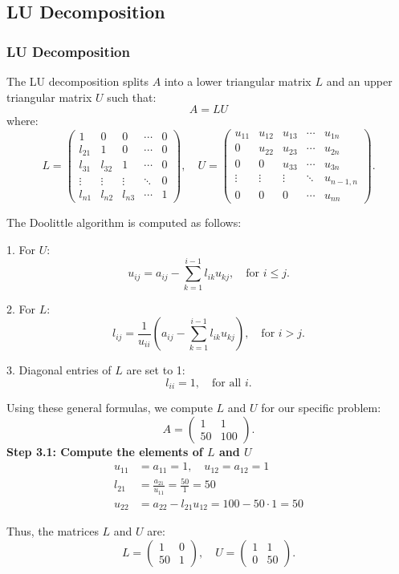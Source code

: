 \documentclass{beamer}
\theoremstyle{remark}
\numberwithin{equation}{section}
\begin{document}
	\subsection{LU Decomposition}
	\begin{frame}[allowframebreaks]
		\frametitle{LU Decomposition}
		The LU decomposition splits \(A\) into a lower triangular matrix \(L\) and an upper triangular matrix \(U\) such that:
		\[
		A = LU
		\]
		where:
		\[
		L = \begin{pmatrix} 1 & 0 & 0 & \cdots & 0 \\ l_{21} & 1 & 0 & \cdots & 0 \\ l_{31} & l_{32} & 1 & \cdots & 0 \\ \vdots & \vdots & \vdots & \ddots & 0 \\ l_{n1} & l_{n2} & l_{n3} & \cdots & 1 \end{pmatrix}, \quad
		U = \begin{pmatrix} u_{11} & u_{12} & u_{13} & \cdots & u_{1n} \\ 0 & u_{22} & u_{23} & \cdots & u_{2n} \\ 0 & 0 & u_{33} & \cdots & u_{3n} \\ \vdots & \vdots & \vdots & \ddots & u_{n-1,n} \\ 0 & 0 & 0 & \cdots & u_{nn} \end{pmatrix}.
		\]
		
		The Doolittle algorithm is computed as follows:
		
		1. For \(U\):
		\[
		u_{ij} = a_{ij} - \sum_{k=1}^{i-1} l_{ik} u_{kj}, \quad \text{for } i \leq j.
		\]
		
		2. For \(L\):
		\[
		l_{ij} = \frac{1}{u_{ii}} \left(a_{ij} - \sum_{k=1}^{i-1} l_{ik} u_{kj} \right), \quad \text{for } i > j.
		\]
		
		3. Diagonal entries of \(L\) are set to 1:
		\[
		l_{ii} = 1, \quad \text{for all } i.
		\]
		
		Using these general formulas, we compute \(L\) and \(U\) for our specific problem:
		\[
		A = \begin{pmatrix} 1 & 1 \\ 50 & 100 \end{pmatrix}.
		\]
		\textbf{Step 3.1: Compute the elements of \(L\) and \(U\)}\\
		\begin{align}
			u_{11} &= a_{11} = 1, \quad u_{12} = a_{12} = 1 \\
			l_{21} &= \frac{a_{21}}{u_{11}} = \frac{50}{1} = 50 \\
			u_{22} &= a_{22} - l_{21}u_{12} = 100 - 50 \cdot 1 = 50
		\end{align}
		
		Thus, the matrices \(L\) and \(U\) are:
		\[
		L = \begin{pmatrix} 1 & 0 \\ 50 & 1 \end{pmatrix}, \quad U = \begin{pmatrix} 1 & 1 \\ 0 & 50 \end{pmatrix}.
		\]
		
	\end{frame}
\end{document}
